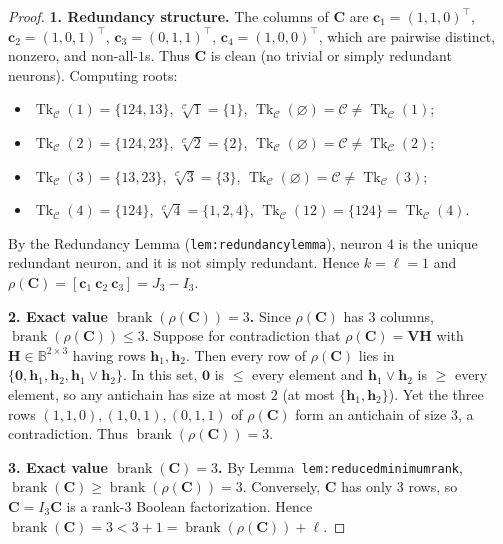 \documentclass[11pt]{article}
\theoremstyle{plain}
\theoremstyle{definition}
\theoremstyle{remark}
\DeclareMathOperator{\brank}{brank}
\DeclareMathOperator{\Tk}{Tk}
\begin{document}
\begin{proof}
\textbf{1. Redundancy structure.}
The columns of $\mathbf{C}$ are $\mathbf{c}_1 = (1,1,0)^\top$, $\mathbf{c}_2 = (1,0,1)^\top$, $\mathbf{c}_3 = (0,1,1)^\top$, $\mathbf{c}_4 = (1,0,0)^\top$, which are pairwise distinct, nonzero, and non-all-$1$s. Thus $\mathbf{C}$ is clean (no trivial or simply redundant neurons). Computing roots:
\begin{itemize}[leftmargin=2em]
\item $\Tk_{\mathcal{C}}(1) = \{124, 13\}$, $\sqrt[\mathcal{C}]{1} = \{1\}$, $\Tk_{\mathcal{C}}(\varnothing) = \mathcal{C} \neq \Tk_{\mathcal{C}}(1)$;
\item $\Tk_{\mathcal{C}}(2) = \{124, 23\}$, $\sqrt[\mathcal{C}]{2} = \{2\}$, $\Tk_{\mathcal{C}}(\varnothing) = \mathcal{C} \neq \Tk_{\mathcal{C}}(2)$;
\item $\Tk_{\mathcal{C}}(3) = \{13, 23\}$, $\sqrt[\mathcal{C}]{3} = \{3\}$, $\Tk_{\mathcal{C}}(\varnothing) = \mathcal{C} \neq \Tk_{\mathcal{C}}(3)$;
\item $\Tk_{\mathcal{C}}(4) = \{124\}$, $\sqrt[\mathcal{C}]{4} = \{1,2,4\}$, $\Tk_{\mathcal{C}}(12) = \{124\} = \Tk_{\mathcal{C}}(4)$.
\end{itemize}
By the Redundancy Lemma (\texttt{lem:redundancylemma}), neuron $4$ is the unique redundant neuron, and it is not simply redundant. Hence $k = \ell = 1$ and $\rho(\mathbf{C}) = [\mathbf{c}_1\ \mathbf{c}_2\ \mathbf{c}_3] = J_3 - I_3$.

\medskip
\noindent\textbf{2. Exact value $\brank(\rho(\mathbf{C})) = 3$.}
Since $\rho(\mathbf{C})$ has $3$ columns, $\brank(\rho(\mathbf{C})) \le 3$. Suppose for contradiction that $\rho(\mathbf{C}) = \mathbf{V}\mathbf{H}$ with $\mathbf{H} \in \mathbb{B}^{2 \times 3}$ having rows $\mathbf{h}_1, \mathbf{h}_2$. Then every row of $\rho(\mathbf{C})$ lies in $\{\mathbf{0}, \mathbf{h}_1, \mathbf{h}_2, \mathbf{h}_1 \vee \mathbf{h}_2\}$. In this set, $\mathbf{0}$ is $\le$ every element and $\mathbf{h}_1 \vee \mathbf{h}_2$ is $\ge$ every element, so any antichain has size at most $2$ (at most $\{\mathbf{h}_1, \mathbf{h}_2\}$). Yet the three rows $(1,1,0), (1,0,1), (0,1,1)$ of $\rho(\mathbf{C})$ form an antichain of size $3$, a contradiction. Thus $\brank(\rho(\mathbf{C})) = 3$.

\medskip
\noindent\textbf{3. Exact value $\brank(\mathbf{C}) = 3$.}
By Lemma~\texttt{lem:reducedminimumrank}, $\brank(\mathbf{C}) \ge \brank(\rho(\mathbf{C})) = 3$. Conversely, $\mathbf{C}$ has only $3$ rows, so $\mathbf{C} = I_3 \mathbf{C}$ is a rank-$3$ Boolean factorization. Hence $\brank(\mathbf{C}) = 3 < 3 + 1 = \brank(\rho(\mathbf{C})) + \ell$.


\end{proof}
\end{document}
